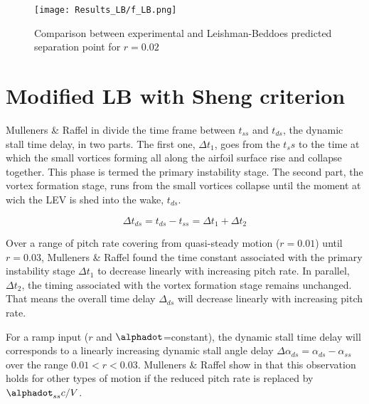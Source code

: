 \begin{figure}[h]
    \centering
    \texttt{[image: Results\_LB/f\_LB.png]}
    \caption{Comparison between experimental and Leishman-Beddoes predicted separation point for $r = 0.02$}
    \label{fig:f_LB}
\end{figure}

\section{Modified LB with Sheng criterion}

Mulleners \& Raffel in \cite{mulleners_onset_2010} divide the time frame between $t_{ss}$ and $t_{ds}$, the dynamic stall time delay, in two parts. The first one, $\Delta t_1$, goes from the $t_ss$ to the time at which the small vortices forming all along the airfoil surface rise and collapse together. This phase is termed the primary instability stage. The second part, the vortex formation stage, runs from the small vortices collapse until the moment at wich the LEV is shed into the wake, $t_{ds}$.

\begin{equation}
\Delta t_{ds} = t_{ds} - t_{ss}  = \Delta t_1 + \Delta t_2
\end{equation}

Over a range of pitch rate covering from quasi-steady motion ($r=0.01$) until $r=0.03$, Mulleners \& Raffel \cite{mulleners_onset_2010,mulleners_onset_2012,mulleners_dynamic_2013} found the time constant associated with the primary instability stage $\Delta t_1$ to decrease linearly with increasing pitch rate. In parallel, $\Delta t_2$, the timing associated with the vortex formation stage remains unchanged. That means the overall time delay $\Delta _{ds}$ will decrease linearly with increasing pitch rate. 

For a ramp input ($r$ and $\alphadot$=constant), the dynamic stall time delay will corresponds to a linearly increasing dynamic stall angle delay $\Delta \alpha_{ds} = \alpha_{ds} - \alpha_{ss}$ over the range $0.01<r<0.03$. Mulleners \& Raffel show in \cite{mulleners_onset_2012} that this observation holds for other types of motion if the reduced pitch rate is replaced by $\alphadot_{ss} c /V$.

